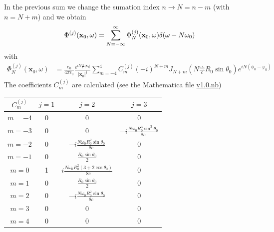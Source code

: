 In the previous sum we change the sumation index $n\rightarrow N = n-m$ (with $n=N+m$) and we obtain
\begin{align}
    \Phi^{(j)}({\bf x}_0,\omega) = \sum\limits_{N=-\infty}^{\infty} \Phi_N^{(j)}({\bf x}_0,\omega)\delta(\omega-N\omega_0)
\end{align}
with
\begin{align}
    \Phi^{(j)}_N({\bm x}_0,\omega) & =\frac{e_0}{4\pi\epsilon_0}\frac{ e^{iN\frac{\omega_0}c|{\bm x}_0|}}{|{\bm x}_0|^j}\sum\limits_{m=-4}^{4} C^{(j)}_m (-i)^{N+m}J_{N+m}(N\frac{\omega_0}cR_0\sin\theta_0) e^{iN(\phi_0-\varphi_0)}
\end{align}
The coefficients $C^{(j)}_m$ are calculated (see the Mathematica file \href{run:/home/madalina/Dropbox/work/bin/Mathematica/helical/circular-motion-angular-mom/v1.0.nb}{v1.0.nb})

\begin{table}[h]
    \centering
    \renewcommand{\arraystretch}{2.5}
    \begin{tabular}{|c||c|c|c|}
        \hline
        $C_m^{(j)}$ & $j=1$ & $j=2$                                           & $j=3$                                       \\
        \hline
        \hline
        $m=-4$      & 0     & 0                                               & 0                                           \\
        \hline
        $m=-3$      & 0     & 0                                               & $-i\frac{N\omega_0R_0^3\sin^3\theta_0}{8c}$ \\
        \hline
        $m=-2$      & 0     & $-i\frac{N\omega_0R_0^2\sin\theta_0}{8c}$       & 0                                           \\
        \hline
        $m=-1$      & 0     & $\frac{R_0\sin\theta_0}{2}$                     & 0                                           \\
        \hline
        $m=0$       & 1     & $i \frac{N\omega_0 R_0^2(3+2\cos\theta_0)}{8c}$ & 0                                           \\
        \hline
        $m=1$       & 0     & $\frac{R_0\sin\theta_0}{2}$                     & 0                                           \\
        \hline
        $m=2$       & 0     & $-i\frac{N\omega_0R_0^2\sin\theta_0}{8c}$       & 0                                           \\
        \hline
        $m=3$       & 0     & 0                                               & 0                                           \\
        \hline
        $m=4$       & 0     & 0                                               & 0                                           \\
        \hline
    \end{tabular}
\end{table}








